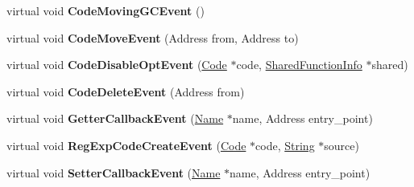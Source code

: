 \begin{DoxyCompactItemize}
\item 
\hypertarget{classv8_1_1internal_1_1_cpu_profiler_ac2e5e32c36ddee7b1e67fbd7d3185112}{}virtual void {\bfseries Code\+Moving\+G\+C\+Event} ()\label{classv8_1_1internal_1_1_cpu_profiler_ac2e5e32c36ddee7b1e67fbd7d3185112}

\item 
\hypertarget{classv8_1_1internal_1_1_cpu_profiler_abddef1449b269670a404f5caf70d40a1}{}virtual void {\bfseries Code\+Move\+Event} (Address from, Address to)\label{classv8_1_1internal_1_1_cpu_profiler_abddef1449b269670a404f5caf70d40a1}

\item 
\hypertarget{classv8_1_1internal_1_1_cpu_profiler_aa1946c65ac4965927c5f8c4aa6b49a41}{}virtual void {\bfseries Code\+Disable\+Opt\+Event} (\hyperlink{classv8_1_1internal_1_1_code}{Code} $\ast$code, \hyperlink{classv8_1_1internal_1_1_shared_function_info}{Shared\+Function\+Info} $\ast$shared)\label{classv8_1_1internal_1_1_cpu_profiler_aa1946c65ac4965927c5f8c4aa6b49a41}

\item 
\hypertarget{classv8_1_1internal_1_1_cpu_profiler_ac8b29baed3949af61343725b23b3c2dc}{}virtual void {\bfseries Code\+Delete\+Event} (Address from)\label{classv8_1_1internal_1_1_cpu_profiler_ac8b29baed3949af61343725b23b3c2dc}

\item 
\hypertarget{classv8_1_1internal_1_1_cpu_profiler_a911b7d335462d52e5a0d80d976a5a12a}{}virtual void {\bfseries Getter\+Callback\+Event} (\hyperlink{classv8_1_1internal_1_1_name}{Name} $\ast$name, Address entry\+\_\+point)\label{classv8_1_1internal_1_1_cpu_profiler_a911b7d335462d52e5a0d80d976a5a12a}

\item 
\hypertarget{classv8_1_1internal_1_1_cpu_profiler_ad5fcd588f127c47fd922c7a24671d642}{}virtual void {\bfseries Reg\+Exp\+Code\+Create\+Event} (\hyperlink{classv8_1_1internal_1_1_code}{Code} $\ast$code, \hyperlink{classv8_1_1internal_1_1_string}{String} $\ast$source)\label{classv8_1_1internal_1_1_cpu_profiler_ad5fcd588f127c47fd922c7a24671d642}

\item 
\hypertarget{classv8_1_1internal_1_1_cpu_profiler_afef25c8d6e8ed6c6023a25bdd37b3a82}{}virtual void {\bfseries Setter\+Callback\+Event} (\hyperlink{classv8_1_1internal_1_1_name}{Name} $\ast$name, Address entry\+\_\+point)\label{classv8_1_1internal_1_1_cpu_profiler_afef25c8d6e8ed6c6023a25bdd37b3a82}


\end{DoxyCompactItemize}
